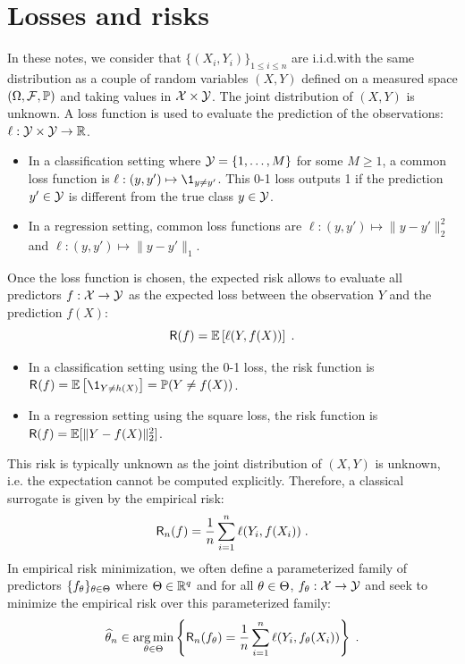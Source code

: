 \section{Losses and risks}
In these notes, we consider that $\{(X_i,Y_i)\}_{1\leqslant i \leqslant n}$ are i.i.d.with the same distribution as a couple of random variables $(X,Y)$ defined on  a measured space $(\Omega,\mathcal{F},\mathbb{P})$ and taking values in $\mathcal{X}\times\mathcal{Y}$. The joint distribution of $(X,Y)$ is unknown. A loss function is used to evaluate the prediction of the observations: $\ell: \mathcal{Y}\times \mathcal{Y} \to \mathbb{R}$.
\begin{itemize}
\item In a classification setting where $\mathcal{Y} = \{1,\ldots,M\}$ for some $M\geqslant 1$, a common loss function is $\ell : (y,y')\mapsto \1_{y\neq y'}$. This 0-1 loss outputs 1 if the prediction $y'\in\mathcal{Y}$ is different from the true class $y\in\mathcal{Y}$.
\item In a regression setting,  common loss functions are $\ell : (y,y')\mapsto \|y-y'\|_2^2$ and $\ell : (y,y')\mapsto \|y-y'\|_1$.
\end{itemize}
Once the loss function is chosen, the expected risk allows to evaluate all predictors $f: \mathcal{X}\to \mathcal{Y}$ as the expected loss between the observation $Y$ and the prediction $f(X)$:
$$
\mathsf{R}(f) = \mathbb{E}\left[\ell(Y,f(X))\right]\;.
$$
\begin{itemize}
\item In a classification setting using the 0-1 loss, the risk function is $\mathsf{R}_{}(f) = \bE\left[\1_{Y\neq h(X)}\right]= \bP(Y\neq f(X))$.
\item In a regression setting using the square loss,   the risk function is $\mathsf{R}(f) = \mathbb{E}[\|Y-f(X)\|^2_2]$.
\end{itemize}
This risk is typically unknown as the joint distribution of $(X,Y)$ is unknown, i.e. the expectation cannot be computed explicitly. Therefore, a classical surrogate is given by the empirical risk:
$$
\mathsf{R}_n(f) = \frac{1}{n}\sum_{i=1}^n\ell(Y_i,f(X_i))\;.
$$
In empirical risk minimization, we often define a parameterized family of predictors $\{f_\theta\}_{\theta\in \Theta}$ where $\Theta\in \mathbb{R}^q$ and for all $\theta\in\Theta$, $f_\theta: \mathcal{X}\to \mathcal{Y}$ and seek to minimize the empirical risk over this parameterized family:
$$
\widehat\param_n \in\argmin_{\param\in\paramset} \left\{\mathsf{R}_n(f_\param) = \frac{1}{n}\sum_{i=1}^n\ell(Y_i,f_\param(X_i)) \right\}\eqsp.
$$


